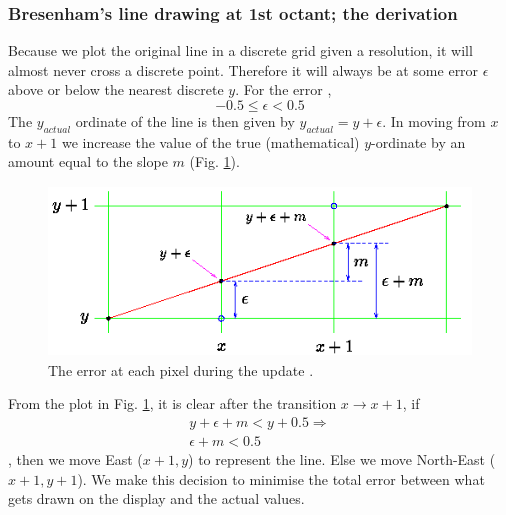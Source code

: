 \documentclass[a4paper]{article}
\begin{document}
\subsubsection{Bresenham's line drawing at 1st octant; the derivation}

Because we plot the original line in a discrete grid given a resolution, it will almost never cross a discrete point. Therefore it will always be at some error $\epsilon$ above or below the nearest discrete $y$. For the error \cite{mallinus},
\begin{equation}
	-0.5 \leq \epsilon <0.5
\end{equation}
The $y_{actual}$ ordinate of the line is then given by $y_{actual} = y+\epsilon$. In moving from $x$ to $x+1$ we increase the value of the true (mathematical) $y$-ordinate by an amount equal to the slope $m$ (Fig. \ref{fig:error_diagram}).
\begin{figure}[H]
	\centering
	\includegraphics[height=4.5cm]{img/error_diagram.png}
	\caption{The error at each pixel during the update \cite{mallinus}.}
	\label{fig:error_diagram}
\end{figure}
From the plot in Fig. \ref{fig:error_diagram}, it is clear after the transition $x\rightarrow x+1$, if 
\begin{gather*}
	y + \epsilon + m < y+  0.5 \Rightarrow\\
	\epsilon + m < 0.5
\end{gather*}
, then we move East ($x+1,y$) to represent the line. Else we move North-East ($x+1,y+1$). We make this decision to minimise the total error between what gets drawn on the display and the actual values.
\end{document}
